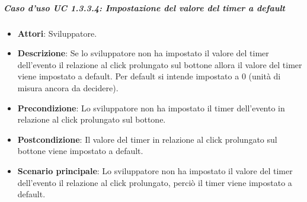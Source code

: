 \subparagraph{Caso d'uso UC 1.3.3.4: Impostazione del valore del timer a default}

\FloatBarrier
\begin{itemize}
\item\textbf{Attori}: Sviluppatore.
\item\textbf{Descrizione}: Se lo sviluppatore non ha impostato il valore del timer dell'evento il relazione al click prolungato sul bottone allora il valore del timer viene impostato a default. Per default si intende impostato a 0 (unità di misura ancora da decidere). 
\item\textbf{Precondizione}: Lo sviluppatore non ha impostato il timer dell'evento in relazione al click prolungato sul bottone.
\item\textbf{Postcondizione}: Il valore del timer in relazione al click prolungato sul bottone viene impostato a default.
\item\textbf{Scenario principale}: Lo sviluppatore non ha impostato il valore del timer dell'evento il relazione al click prolungato, perciò il timer viene impostato a default.
\end{itemize}
